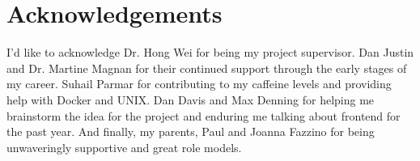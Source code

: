 \section{Acknowledgements}
I'd like to acknowledge Dr. Hong Wei for being my project supervisor. Dan Justin and Dr. Martine Magnan for their continued support through the early stages of my career. Suhail Parmar for contributing to my caffeine levels and providing help with Docker and UNIX. Dan Davis and Max Denning for helping me brainstorm the idea for the project and enduring me talking about frontend for the past year. And finally, my parents, Paul and Joanna Fazzino for being unwaveringly supportive and great role models.
\pagebreak
